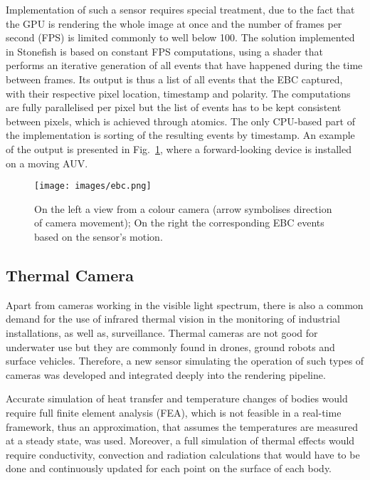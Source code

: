 Implementation of such a sensor requires special treatment, due to the fact that the GPU is rendering the whole image at once and the number of frames per second (FPS) is limited commonly to well below 100. The solution implemented in Stonefish is based on constant FPS computations, using a shader that performs an iterative generation of all events that have happened during the time between frames. 
Its output is thus a list of all events that the EBC captured, with their respective pixel location, timestamp and polarity. The computations are fully parallelised per pixel but the list of events has to be kept consistent between pixels, which is achieved through atomics. The only CPU-based part of the implementation is sorting of the resulting events by timestamp. An example of the output is presented in Fig.~\ref{fig:evB}, where a forward-looking device is installed on a moving AUV.

\begin{figure}[t]
	\centering
	\texttt{[image: images/ebc.png]}
	\caption{On the left a view from a colour camera (arrow symbolises direction of camera movement); On the right the corresponding EBC events based on the sensor's motion.} 
		\label{fig:evB}
\end{figure}

\subsection{Thermal Camera}
Apart from cameras working in the visible light spectrum, there is also a common demand for the use of infrared thermal vision in the monitoring of industrial installations, as well as, surveillance. Thermal cameras are not good for underwater use but they are commonly found in drones, ground robots and surface vehicles. Therefore, a new sensor simulating the operation of such types of cameras was developed and integrated deeply into the rendering pipeline. 

Accurate simulation of heat transfer and temperature changes of bodies would require full finite element analysis (FEA), which is not feasible in a real-time framework, thus an approximation, that assumes the temperatures are measured at a steady state, was used. Moreover, a full simulation of thermal effects would require conductivity, convection and radiation calculations that would have to be done and continuously updated for each point on the surface of each body. 

